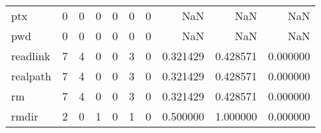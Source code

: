 \begin{longtable}{lrrrrrrrrr}
ptx       &                                                  0 &                                                  0 &                                                  0 &                                                  0 &                                                  0 &                                                  0 &                                                NaN &                                    NaN &                                  NaN \\
pwd       &                                                  0 &                                                  0 &                                                  0 &                                                  0 &                                                  0 &                                                  0 &                                                NaN &                                    NaN &                                  NaN \\
readlink  &                                                  7 &                                                  4 &                                                  0 &                                                  0 &                                                  3 &                                                  0 &                                           0.321429 &                               0.428571 &                             0.000000 \\
realpath  &                                                  7 &                                                  4 &                                                  0 &                                                  0 &                                                  3 &                                                  0 &                                           0.321429 &                               0.428571 &                             0.000000 \\
rm        &                                                  7 &                                                  4 &                                                  0 &                                                  0 &                                                  3 &                                                  0 &                                           0.321429 &                               0.428571 &                             0.000000 \\
rmdir     &                                                  2 &                                                  0 &                                                  1 &                                                  0 &                                                  1 &                                                  0 &                                           0.500000 &                               1.000000 &                             0.000000 \\

\end{longtable}
